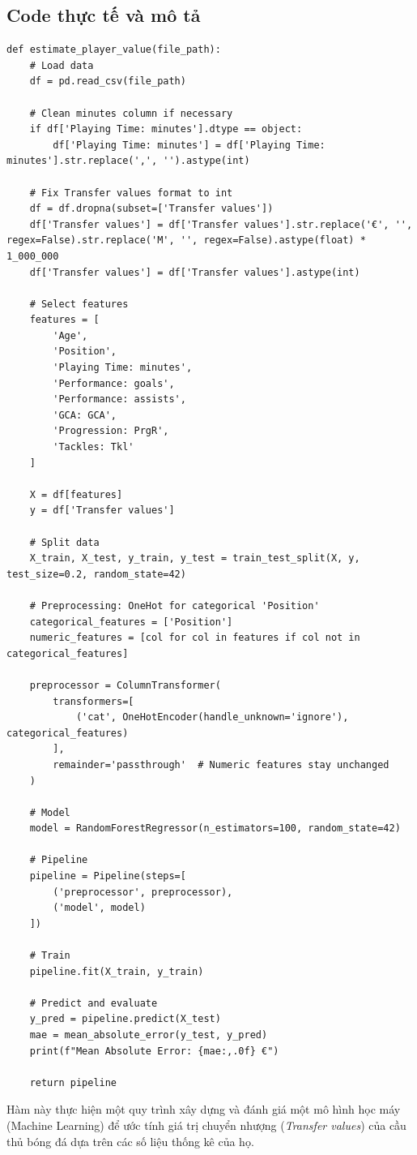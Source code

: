 \documentclass[12pt]{report}
\begin{document}
{\subsection{Code thực tế và mô tả}
\begin{lstlisting}
def estimate_player_value(file_path):
    # Load data
    df = pd.read_csv(file_path)
    
    # Clean minutes column if necessary
    if df['Playing Time: minutes'].dtype == object:
        df['Playing Time: minutes'] = df['Playing Time: minutes'].str.replace(',', '').astype(int)
    
    # Fix Transfer values format to int
    df = df.dropna(subset=['Transfer values'])
    df['Transfer values'] = df['Transfer values'].str.replace('€', '', regex=False).str.replace('M', '', regex=False).astype(float) * 1_000_000
    df['Transfer values'] = df['Transfer values'].astype(int)

    # Select features
    features = [
        'Age',
        'Position',
        'Playing Time: minutes',
        'Performance: goals',
        'Performance: assists',
        'GCA: GCA',
        'Progression: PrgR',
        'Tackles: Tkl'
    ]

    X = df[features]
    y = df['Transfer values']
    
    # Split data
    X_train, X_test, y_train, y_test = train_test_split(X, y, test_size=0.2, random_state=42)

    # Preprocessing: OneHot for categorical 'Position'
    categorical_features = ['Position']
    numeric_features = [col for col in features if col not in categorical_features]
    
    preprocessor = ColumnTransformer(
        transformers=[
            ('cat', OneHotEncoder(handle_unknown='ignore'), categorical_features)
        ],
        remainder='passthrough'  # Numeric features stay unchanged
    )
    
    # Model
    model = RandomForestRegressor(n_estimators=100, random_state=42)
    
    # Pipeline
    pipeline = Pipeline(steps=[
        ('preprocessor', preprocessor),
        ('model', model)
    ])
    
    # Train
    pipeline.fit(X_train, y_train)
    
    # Predict and evaluate
    y_pred = pipeline.predict(X_test)
    mae = mean_absolute_error(y_test, y_pred)
    print(f"Mean Absolute Error: {mae:,.0f} €")
    
    return pipeline
\end{lstlisting}
Hàm này thực hiện một quy trình xây dựng và đánh giá một mô hình học máy (Machine Learning) để ước tính giá trị chuyển nhượng (\textit{Transfer values}) của cầu thủ bóng đá dựa trên các số liệu thống kê của họ.

}
\end{document}
